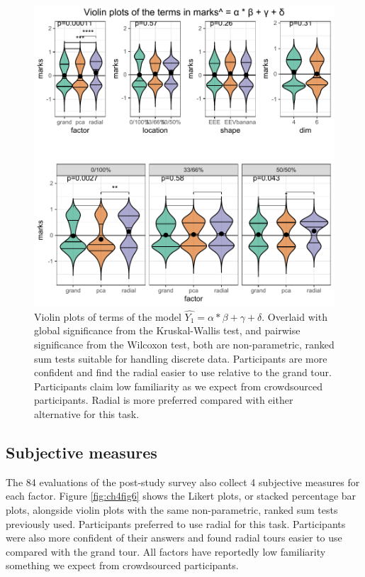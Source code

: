 \documentclass{monashthesis}
\begin{document}
\begin{figure}

{\centering \includegraphics[width=1\linewidth,]{./figures_from_script/ch4_fig5_ABcd_violins} 

}

\caption{Violin plots of terms of the model $\widehat{Y_1} = \alpha * \beta + \gamma + \delta$. Overlaid with global significance from the Kruskal-Wallis test, and pairwise significance from the Wilcoxon test, both are non-parametric, ranked sum tests suitable for handling discrete data. Participants are more confident and find the radial easier to use relative to the grand tour. Participants claim low familiarity as we expect from crowdsourced participants. Radial is more preferred compared with either alternative for this task.}\label{fig:ch4fig5}
\end{figure}

\hypertarget{subjective-measures}{%
\subsection{Subjective measures}\label{subjective-measures}}

The 84 evaluations of the post-study survey also collect 4 subjective measures for each factor. Figure \ref{fig:ch4fig6} shows the Likert plots, or stacked percentage bar plots, alongside violin plots with the same non-parametric, ranked sum tests previously used. Participants preferred to use radial for this task. Participants were also more confident of their answers and found radial tours easier to use compared with the grand tour. All factors have reportedly low familiarity something we expect from crowdsourced participants.
\end{document}
